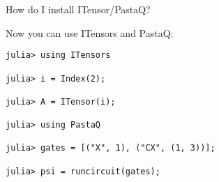 \begin{frame}[fragile]{How do I install ITensor/PastaQ?}

Now you can use ITensors and PastaQ:
\begin{lstlisting}[language=JuliaLocal, numbers=none, style=julia, basicstyle=\small]
julia> using ITensors

julia> i = Index(2);

julia> A = ITensor(i);

julia> using PastaQ

julia> gates = [("X", 1), ("CX", (1, 3))];

julia> psi = runcircuit(gates);
\end{lstlisting}

\end{frame}
